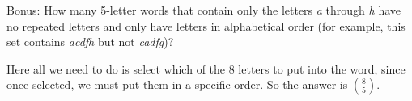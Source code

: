 \documentclass[12pt]{exam}
\begin{document}
\begin{questions}
\bonusquestion[2] Bonus: How many 5-letter words that contain only the letters \emph{a} through \emph{h} have no repeated letters and only have letters in alphabetical order (for example, this set contains \emph{acdfh} but not \emph{cadfg})?
\begin{solution}
  Here all we need to do is select which of the 8 letters to put into the word, since once selected, we must put them in a specific order.  So the answer is $\binom{8}{5}$.
\end{solution}





\end{questions}
\end{document}
